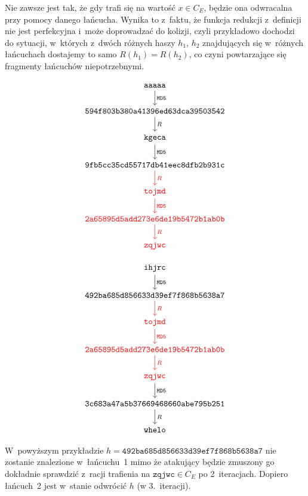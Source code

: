 Nie zawsze jest tak, że gdy trafi się na wartość $x \in C_E$, będzie ona
odwracalna przy pomocy danego łańcucha. Wynika to z~faktu, że funkcja redukcji
z~definicji nie jest perfekcyjna i~może doprowadzać do kolizji, czyli
przykładowo dochodzi do sytuacji, w~których z~dwóch różnych haszy $h_1$, $h_2$
znajdujących się w~różnych łańcuchach dostajemy to samo $R(h_1) = R(h_2)$, co
czyni powtarzające się fragmenty łańcuchów niepotrzebnymi.

\begin{multicols}{2}
    \[
    \begin{tikzcd}
        \mathtt{aaaaa} \arrow{d}{\mathtt{MD5}} \\
        \mathtt{594f803b380a41396ed63dca39503542} \arrow{d}{R} \\
        \mathtt{kgeca} \arrow{d}{\mathtt{MD5}} \\
        \mathtt{9fb5cc35cd55717db41eec8dfb2b931c} \arrow[color=red]{d}{R} \\
        \mathtt{\textcolor{red}{tojmd}} \arrow[color=red]{d}{\mathtt{MD5}} \\
        \mathtt{\textcolor{red}{2a65895d5add273e6de19b5472b1ab0b}} \arrow[color=red]{d}{R} \\
        \mathtt{\textcolor{red}{zqjwc}}
    \end{tikzcd}
    \]

\columnbreak

    \[
    \begin{tikzcd}
        \mathtt{ihjrc} \arrow{d}{\mathtt{MD5}} \\
        \mathtt{492ba685d856633d39ef7f868b5638a7} \arrow[color=red]{d}{R} \\
        \mathtt{\textcolor{red}{tojmd}} \arrow[color=red]{d}{\mathtt{MD5}} \\
        \mathtt{\textcolor{red}{2a65895d5add273e6de19b5472b1ab0b}} \arrow[color=red]{d}{R} \\
        \mathtt{\textcolor{red}{zqjwc}} \arrow{d}{\mathtt{MD5}} \\
        \mathtt{3c683a47a5b37669468660abe795b251} \arrow{d}{R} \\
        \mathtt{whelo}
    \end{tikzcd}
    \]
\end{multicols}

W~powyższym przykładzie $h = \mathtt{492ba685d856633d39ef7f868b5638a7}$ nie
zostanie znalezione w~łańcuchu~1 mimo że atakujący będzie zmuszony go dokładnie
sprawdzić z~racji trafienia na $\mathtt{zqjwc} \in C_E$ po 2~iteracjach.
Dopiero łańcuch~2 jest w~stanie odwrócić $h$ (w 3.~iteracji).



